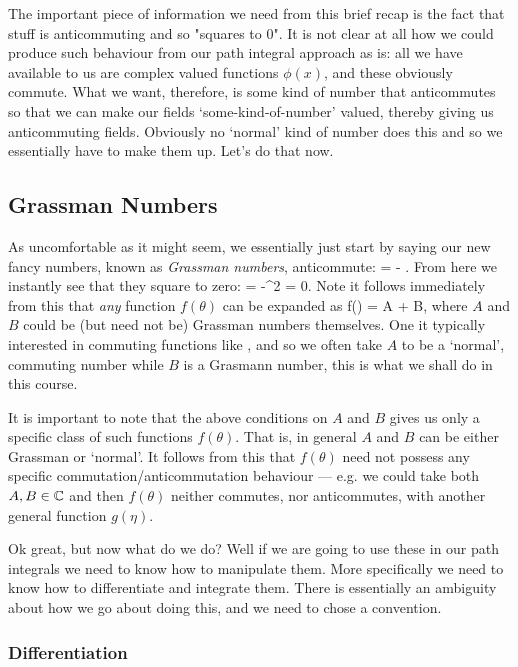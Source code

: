 The important piece of information we need from this brief recap is the fact that stuff is anticommuting and so "squares to 0". It is not clear at all how we could produce such behaviour from our path integral approach as is: all we have available to us are complex valued functions $\phi(x)$, and these obviously commute. What we want, therefore, is some kind of number that anticommutes so that we can make our fields `some-kind-of-number' valued, thereby giving us anticommuting fields. Obviously no `normal' kind of number does this and so we essentially have to make them up. Let's do that now. 

\subsection{Grassman Numbers}

As uncomfortable as it might seem, we essentially just start by saying our new fancy numbers, known as \textit{Grassman numbers}, anticommute:
\be 
\label{eqn:GrassmanNunbers}
    \theta \eta = - \eta \theta.
\ee 
From here we instantly see that they square to zero:
\be
\label{eqn:GrassmanSquared}
    \theta\theta = -\theta\theta \qquad \iff \qquad \theta^2 = 0.
\ee 
Note it follows immediately from this that \textit{any} function $f(\theta)$ can be expanded as 
\be 
\label{eqn:f(theta)}
    f(\theta) = A + B\theta,
\ee 
where $A$ and $B$ could be (but need not be) Grassman numbers themselves.  One it typically interested in commuting functions like , and so we often take $A$ to be a `normal', commuting number while $B$ is a Grasmann number, this is what we shall do in this course.

\br 
   It is important to note that the above conditions on $A$ and $B$ gives us only a specific class of such functions $f(\theta)$. That is, in general $A$ and $B$ can be either Grassman or `normal'. It follows from this that $f(\theta)$ need not possess any specific commutation/anticommutation behaviour --- e.g. we could take both $A,B\in\mathbb{C}$ and then $f(\theta)$ neither commutes, nor anticommutes, with another general function $g(\eta)$. 
\er 

Ok great, but now what do we do? Well if we are going to use these in our path integrals we need to know how to manipulate them. More specifically we need to know how to differentiate and integrate them. There is essentially an ambiguity about how we go about doing this, and we need to chose a convention. 

\subsubsection{Differentiation}

